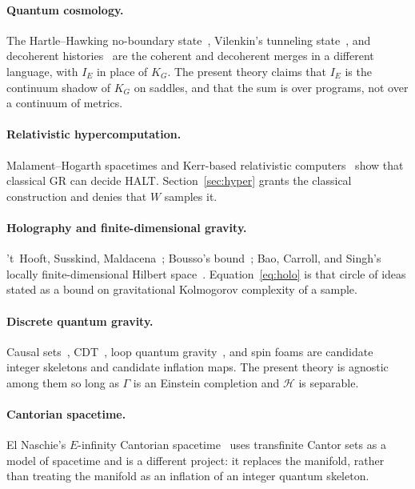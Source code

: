 \documentclass[11pt,a4paper]{article}
\theoremstyle{plain}
\theoremstyle{definition}
\theoremstyle{remark}
\newcommand{\Hil}{\mathcal{H}}
\newcommand{\KG}{K_{G}}
\begin{document}
\paragraph{Quantum cosmology.}
The Hartle--Hawking no-boundary state~\cite{hartle1983}, Vilenkin's tunneling state~\cite{vilenkin1983}, and decoherent histories~\cite{gellmann1993,hartle2008} are the coherent and decoherent merges in a different language, with $I_{E}$ in place of $\KG$.
The present theory claims that $I_{E}$ is the continuum shadow of $\KG$ on saddles, and that the sum is over programs, not over a continuum of metrics.

\paragraph{Relativistic hypercomputation.}
Malament--Hogarth spacetimes and Kerr-based relativistic computers~\cite{earman1993,hogarth2004,etesi2002,nemeti2006,welch2008} show that classical GR can decide HALT.
Section~\ref{sec:hyper} grants the classical construction and denies that $W$ samples it.

\paragraph{Holography and finite-dimensional gravity.}
't~Hooft, Susskind, Maldacena~\cite{tHooft1993,susskind1995,maldacena1998}; Bousso's bound~\cite{bousso1999}; Bao, Carroll, and Singh's locally finite-dimensional Hilbert space~\cite{bao2017}.
Equation~\eqref{eq:holo} is that circle of ideas stated as a bound on gravitational Kolmogorov complexity of a sample.

\paragraph{Discrete quantum gravity.}
Causal sets~\cite{bombelli1987}, CDT~\cite{ambjorn2005}, loop quantum gravity~\cite{rovelli2004,fairbairn2004}, and spin foams are candidate integer skeletons and candidate inflation maps.
The present theory is agnostic among them so long as $\Gamma$ is an Einstein completion and $\Hil$ is separable.

\paragraph{Cantorian spacetime.}
El Naschie's $E$-infinity Cantorian spacetime~\cite{elnaschie2004} uses transfinite Cantor sets as a model of spacetime and is a different project: it replaces the manifold, rather than treating the manifold as an inflation of an integer quantum skeleton.
\end{document}
